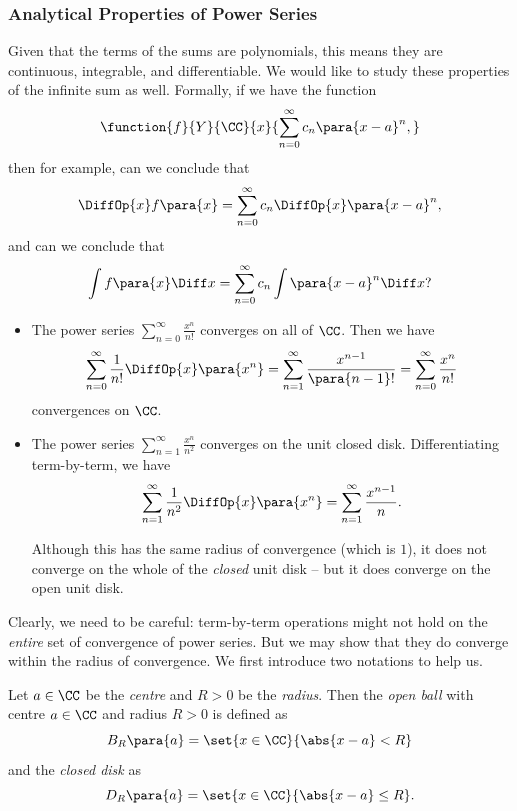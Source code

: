 \subsubsection{Analytical Properties of Power Series}

Given that the terms of the sums are polynomials, this means they are continuous, integrable, and differentiable. We would like to study these properties of the infinite sum as well. Formally, if we have the function
\[
    \function{f}{Y}{\CC}{x}{\sum_{n = 0}^{\infty} c_n \para{x - a}^n,}
\]
then for example, can we conclude that
\[
    \DiffOp{x} f\para{x} = \sum_{n = 0}^{\infty} c_n \DiffOp{x} \para{x - a}^n,
\]
and can we conclude that
\[
    \int f\para{x} \Diff x = \sum_{n = 0}^{\infty} c_n \int \para{x - a}^{n} \Diff x?
\]

\begin{example}
    \label{ex:differentiating-power-series-term-by-term}%
    \begin{itemize}
        \item The power series \(\sum_{n = 0}^{\infty} \frac{x^n}{n!}\) converges on all of \(\CC\). Then we have
        \[
            \sum_{n = 0}^{\infty} \frac{1}{n!} \DiffOp{x} \para{x^n} = \sum_{n = 1}^{\infty} \frac{x^{n - 1}}{\para{n - 1}!} = \sum_{n = 0}^{\infty} \frac{x^n}{n!}
        \]
        convergences on \(\CC\).

        \item The power series \(\sum_{n = 1}^{\infty} \frac{x^n}{n^2}\) converges on the unit closed disk. Differentiating term-by-term, we have
        \[
            \sum_{n = 1}^{\infty} \frac{1}{n^2} \DiffOp{x} \para{x^n} = \sum_{n = 1}^{\infty} \frac{x^{n - 1}}{n}.
        \]

        Although this has the same radius of convergence (which is \(1\)), it does not converge on the whole of the \emph{closed} unit disk -- but it does converge on the open unit disk.
    \end{itemize}
\end{example}

Clearly, we need to be careful: term-by-term operations might not hold on the \emph{entire} set of convergence of power series. But we may show that they do converge within the radius of convergence. We first introduce two notations to help us. 

\begin{definition}
    \label{def:open-ball-closed-disk}%
    Let \(a \in \CC\) be the \emph{centre} and \(R > 0\) be the \emph{radius}. Then the \emph{open ball} with centre \(a \in \CC\) and radius \(R > 0\) is defined as
    \[
        B_R \para{a} = \set{x \in \CC}{\abs{x - a} < R}
    \]
    and the \emph{closed disk} as
    \[
        D_R \para{a} = \set{x \in \CC}{\abs{x - a} \leq R}.
    \]
\end{definition}

